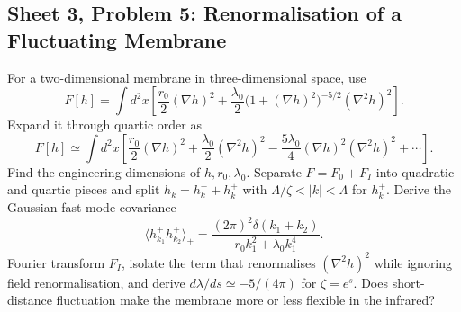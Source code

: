 \subsection{Sheet 3, Problem 5: Renormalisation of a Fluctuating Membrane}

For a two-dimensional membrane in three-dimensional space, use
\begin{equation}
    F[h]=\int d^2x\left[
    \frac{r_0}{2}(\nabla h)^2
    +\frac{\lambda_0}{2}
    \bigl(1+(\nabla h)^2\bigr)^{-5/2}(\nabla^2h)^2\right].
\end{equation}
Expand it through quartic order as
\begin{equation}
    F[h]\simeq\int d^2x\left[
    \frac{r_0}{2}(\nabla h)^2
    +\frac{\lambda_0}{2}(\nabla^2h)^2
    -\frac{5\lambda_0}{4}(\nabla h)^2(\nabla^2h)^2
    +\cdots\right].
\end{equation}
Find the engineering dimensions of $h,r_0,\lambda_0$.
Separate $F=F_0+F_I$ into quadratic and quartic pieces and split
$h_k=h_k^-+h_k^+$ with $\Lambda/\zeta<|k|<\Lambda$ for $h_k^+$.
Derive the Gaussian fast-mode covariance
\begin{equation}
    \langle h_{k_1}^+h_{k_2}^+\rangle_+
    =\frac{(2\pi)^2\delta(k_1+k_2)}
    {r_0k_1^2+\lambda_0k_1^4}.
\end{equation}
Fourier transform $F_I$, isolate the term that renormalises
$(\nabla^2h)^2$ while ignoring field renormalisation, and derive
$d\lambda/ds\simeq-5/(4\pi)$ for $\zeta=e^s$.
Does short-distance fluctuation make the membrane more or less
flexible in the infrared?
